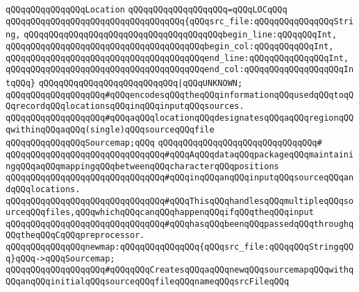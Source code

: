 \newline
\verb|qQQqqQQqqQQqqQQqLocation|\newline
\verb|qQQqqQQqqQQqqQQqqQQq=qQQqLOCqQQq|\newline
\verb|qQQqqQQqqQQqqQQqqQQqqQQqqQQqqQQqqQQq{qQQqsrc_file:qQQqqQQqqQQqqQQqString,|\newline
\verb|qQQqqQQqqQQqqQQqqQQqqQQqqQQqqQQqqQQqqQQqbegin_line:qQQqqQQqInt,|\newline
\verb|qQQqqQQqqQQqqQQqqQQqqQQqqQQqqQQqqQQqqQQqbegin_col:qQQqqQQqqQQqInt,|\newline
\verb|qQQqqQQqqQQqqQQqqQQqqQQqqQQqqQQqqQQqqQQqend_line:qQQqqQQqqQQqqQQqInt,|\newline
\verb|qQQqqQQqqQQqqQQqqQQqqQQqqQQqqQQqqQQqqQQqend_col:qQQqqQQqqQQqqQQqqQQqIntqQQq}|\newline
\verb|qQQqqQQqqQQqqQQqqQQqqQQqqQQq|\verb#|qQQqUNKNOWN;#\newline
\verb|qQQqqQQqqQQqqQQqqQQq#qQQqencodesqQQqtheqQQqinformationqQQqusedqQQqtoqQQqrecordqQQqlocationsqQQqinqQQqinputqQQqsources.|\newline
\verb|qQQqqQQqqQQqqQQqqQQq#qQQqaqQQqlocationqQQqdesignatesqQQqaqQQqregionqQQqwithinqQQqaqQQq(single)qQQqsourceqQQqfile|\newline
\newline
\verb|qQQqqQQqqQQqqQQqSourcemap;qQQq|\newline
\verb|qQQqqQQqqQQqqQQqqQQqqQQqqQQqqQQq#|\newline
\verb|qQQqqQQqqQQqqQQqqQQqqQQqqQQqqQQq#qQQqAqQQqdataqQQqpackageqQQqmaintainingqQQqaqQQqmappingqQQqbetweenqQQqcharacterqQQqpositions|\newline
\verb|qQQqqQQqqQQqqQQqqQQqqQQqqQQqqQQq#qQQqinqQQqanqQQqinputqQQqsourceqQQqandqQQqlocations.|\newline
\verb|qQQqqQQqqQQqqQQqqQQqqQQqqQQqqQQq#qQQqThisqQQqhandlesqQQqmultipleqQQqsourceqQQqfiles,qQQqwhichqQQqcanqQQqhappenqQQqifqQQqtheqQQqinput|\newline
\verb|qQQqqQQqqQQqqQQqqQQqqQQqqQQqqQQq#qQQqhasqQQqbeenqQQqpassedqQQqthroughqQQqtheqQQqCqQQqpreprocessor.|\newline
\newline
\newline
\verb|qQQqqQQqqQQqqQQqnewmap:qQQqqQQqqQQqqQQq{qQQqsrc_file:qQQqqQQqStringqQQq}qQQq->qQQqSourcemap;|\newline
\verb|qQQqqQQqqQQqqQQqqQQq#qQQqqQQqCreatesqQQqaqQQqnewqQQqsourcemapqQQqwithqQQqanqQQqinitialqQQqsourceqQQqfileqQQqnameqQQqsrcFileqQQq|\newline
